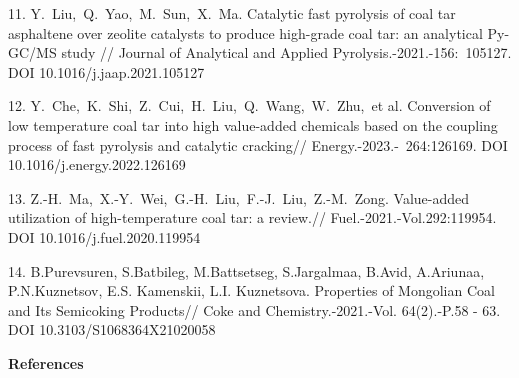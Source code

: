 \begin{noparindent}
11. Y.~Liu,~Q.~Yao,~M.~Sun,~X.~Ma. Catalytic fast pyrolysis of coal tar
asphaltene over zeolite catalysts to produce high-grade coal tar: an
analytical Py-GC/MS study // Journal of Analytical and Applied
Pyrolysis.-2021.-156:~105127. DOI 10.1016/j.jaap.2021.105127

12. Y.~Che,~K.~Shi,~Z.~Cui,~H.~Liu,~Q.~Wang,~W.~Zhu,~et al. Conversion
of low temperature coal tar into high value-added chemicals based on the
coupling process of fast pyrolysis and catalytic cracking//
Energy.-2023.-~264:126169. DOI 10.1016/j.energy.2022.126169

13. Z.-H.~Ma,~X.-Y.~Wei,~G.-H.~Liu,~F.-J.~Liu,~Z.-M.~Zong. Value-added
utilization of high-temperature coal tar: a review.//
Fuel.-2021.-Vol.292:119954. DOI 10.1016/j.fuel.2020.119954

14. B.Purevsuren, S.Batbileg, M.Battsetseg, S.Jargalmaa, B.Avid,
A.Ariunaa, P.N.Kuznetsov, E.S. Kamenskii, L.I. Kuznetsova. Properties of
Mongolian Coal and Its Semicoking Products// Coke and
Chemistry.-2021.-Vol. 64(2).-P.58 - 63. DOI 10.3103/S1068364X21020058
\end{noparindent}

\begin{center}
{\bfseries References}
\end{center}

